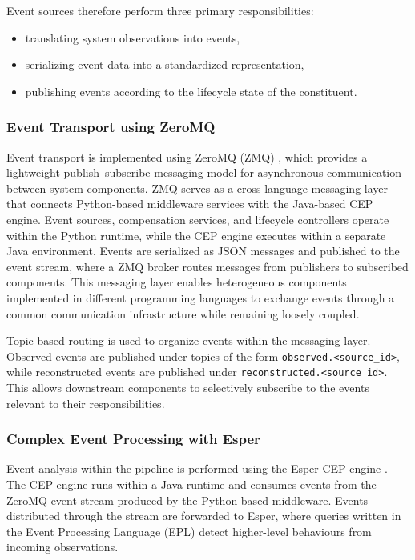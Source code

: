 Event sources therefore perform three primary responsibilities:

\begin{itemize}
\item translating system observations into events,
\item serializing event data into a standardized representation,
\item publishing events according to the lifecycle state of the constituent.
\end{itemize}


\subsubsection{Event Transport using ZeroMQ}

Event transport is implemented using ZeroMQ (ZMQ) \cite{zeromq_org}, which provides a lightweight publish--subscribe messaging model for asynchronous communication between system components. ZMQ serves as a cross-language messaging layer that connects Python-based middleware services with the Java-based CEP engine. Event sources, compensation services, and lifecycle controllers operate within the Python runtime, while the CEP engine executes within a separate Java environment. Events are serialized as JSON messages and published to the event stream, where a ZMQ broker routes messages from publishers to subscribed components. This messaging layer enables heterogeneous components implemented in different programming languages to exchange events through a common communication infrastructure while remaining loosely coupled.




Topic-based routing is used to organize events within the messaging layer. Observed events are published under topics of the form \texttt{observed.<source\_id>}, while reconstructed events are published under \texttt{reconstructed.<source\_id>}. This allows downstream components to selectively subscribe to the events relevant to their responsibilities.



\subsubsection{Complex Event Processing with Esper}

Event analysis within the pipeline is performed using the Esper CEP engine \cite{esper_reference}. The CEP engine runs within a Java runtime and consumes events from the ZeroMQ event stream produced by the Python-based middleware. Events distributed through the stream are forwarded to Esper, where queries written in the Event Processing Language (EPL) detect higher-level behaviours from incoming observations.

